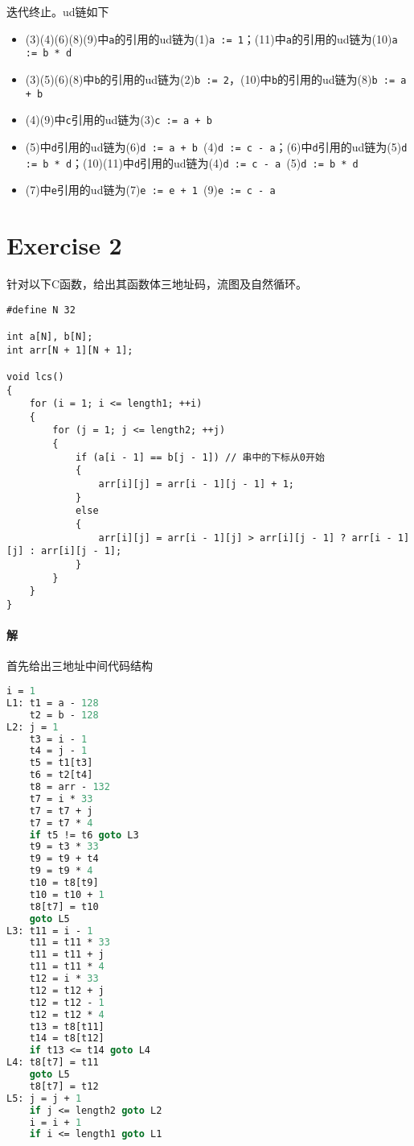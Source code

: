 \documentclass{article}
\begin{document}
迭代终止。ud链如下
\begin{itemize}
    \item (3)(4)(6)(8)(9)中\texttt{a}的引用的ud链为(1)\texttt{a := 1}；(11)中\texttt{a}的引用的ud链为(10)\texttt{a := b * d}
    \item (3)(5)(6)(8)中\texttt{b}的引用的ud链为(2)\texttt{b := 2}，(10)中\texttt{b}的引用的ud链为(8)\texttt{b := a + b}
    \item (4)(9)中\texttt{c}引用的ud链为(3)\texttt{c := a + b}
    \item (5)中\texttt{d}引用的ud链为(6)\texttt{d := a + b }(4)\texttt{d := c - a}；(6)中\texttt{d}引用的ud链为(5)\texttt{d := b * d}；(10)(11)中\texttt{d}引用的ud链为(4)\texttt{d := c - a }(5)\texttt{d := b * d}
    \item (7)中\texttt{e}引用的ud链为(7)\texttt{e := e + 1 }(9)\texttt{e := c - a}
\end{itemize}

\section*{Exercise 2}
针对以下C函数，给出其函数体三地址码，流图及自然循环。

\begin{lstlisting}[style = C]
#define N 32

int a[N], b[N];
int arr[N + 1][N + 1];

void lcs()
{
    for (i = 1; i <= length1; ++i)
    {
        for (j = 1; j <= length2; ++j)
        {
            if (a[i - 1] == b[j - 1]) // 串中的下标从0开始
            {
                arr[i][j] = arr[i - 1][j - 1] + 1;
            }
            else
            {
                arr[i][j] = arr[i - 1][j] > arr[i][j - 1] ? arr[i - 1][j] : arr[i][j - 1];
            }
        }
    }
}
\end{lstlisting}

\paragraph{解}
首先给出三地址中间代码结构
\begin{lstlisting}[language = Pascal, alsolanguage = C, lineskip = 0.1em]
    i = 1
L1: t1 = a - 128
    t2 = b - 128
L2: j = 1
    t3 = i - 1
    t4 = j - 1
    t5 = t1[t3]
    t6 = t2[t4]
    t8 = arr - 132
    t7 = i * 33
    t7 = t7 + j
    t7 = t7 * 4
    if t5 != t6 goto L3
    t9 = t3 * 33
    t9 = t9 + t4
    t9 = t9 * 4
    t10 = t8[t9]
    t10 = t10 + 1
    t8[t7] = t10
    goto L5
L3: t11 = i - 1
    t11 = t11 * 33
    t11 = t11 + j
    t11 = t11 * 4
    t12 = i * 33
    t12 = t12 + j
    t12 = t12 - 1
    t12 = t12 * 4
    t13 = t8[t11]
    t14 = t8[t12]
    if t13 <= t14 goto L4
L4: t8[t7] = t11
    goto L5
    t8[t7] = t12
L5: j = j + 1
    if j <= length2 goto L2
    i = i + 1
    if i <= length1 goto L1
    \end{lstlisting}
\end{document}
